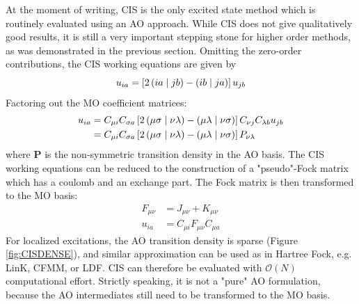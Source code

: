 At the moment of writing, CIS is the only excited state method which is routinely evaluated using an AO approach. While CIS does not give qualitatively good results, it is still a very important stepping stone for higher order methods, as was demonstrated in the previous section. Omitting the zero-order contributions, the CIS working equations are given by
\begin{equation}
u_{ia} = \left[ 2 \left( ia \mid jb \right) - \left( ib \mid ja \right) \right] u_{jb}
\end{equation}
\noindent Factoring out the MO coefficient matrices:
\begin{equation}
\begin{split}
u_{ia} &= C_{\mu i} C_{\sigma a} \left[ 2 \left( \mu\sigma \mid \nu\lambda \right) - \left( \mu\lambda \mid \nu\sigma \right) \right] C_{\nu j} C_{\lambda b} u_{jb} \\ 
&= C_{\mu i} C_{\sigma a} \left[ 2 \left( \mu\sigma \mid \nu\lambda \right) - \left( \mu\lambda \mid \nu\sigma \right) \right] P_{\nu\lambda} 
\end{split}
\end{equation} 
\noindent where $\mathbf{P}$ is the non-symmetric transition density in the AO basis. The CIS working equations can be reduced to the construction of a "pseudo"-Fock matrix which has a coulomb and an exchange part. The Fock matrix is then transformed to the MO basis:
\begin{align}
F_{\mu\nu} &= J_{\mu\nu} + K_{\mu\nu}  \\ 
u_{ia} &= C_{\mu i} F_{\mu\nu} C_{\mu a}  
\end{align}
\noindent For localized excitations, the AO transition density is sparse (Figure \ref{fig:CISDENSE}), and similar approximation can be used as in Hartree Fock, e.g. LinK, CFMM, or LDF. CIS can therefore be evaluated with $\mathcal{O}(N)$ computational effort. Strictly speaking, it is not a "pure" AO formulation, because the AO intermediates still need to be transformed to the MO basis.

